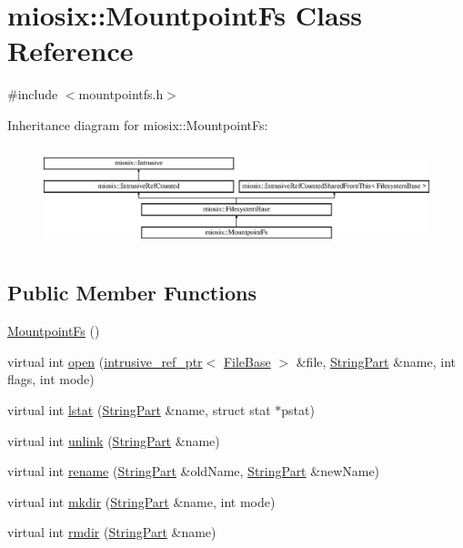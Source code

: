 \hypertarget{classmiosix_1_1_mountpoint_fs}{\section{miosix\-:\-:Mountpoint\-Fs Class Reference}
\label{classmiosix_1_1_mountpoint_fs}
}


{\ttfamily \#include $<$mountpointfs.\-h$>$}

Inheritance diagram for miosix\-:\-:Mountpoint\-Fs\-:\begin{figure}[H]
\begin{center}
\leavevmode
\includegraphics[height=2.962963cm]{classmiosix_1_1_mountpoint_fs}
\end{center}
\end{figure}
\subsection*{Public Member Functions}
\begin{DoxyCompactItemize}
\item 
\hyperlink{classmiosix_1_1_mountpoint_fs_ad4a9516d403dce0cffacfcde4f7e95c3}{Mountpoint\-Fs} ()
\item 
virtual int \hyperlink{classmiosix_1_1_mountpoint_fs_ad27fe12dd7a0ebf4710e3c1239fa4f11}{open} (\hyperlink{classmiosix_1_1intrusive__ref__ptr}{intrusive\-\_\-ref\-\_\-ptr}$<$ \hyperlink{classmiosix_1_1_file_base}{File\-Base} $>$ \&file, \hyperlink{classmiosix_1_1_string_part}{String\-Part} \&name, int flags, int mode)
\item 
virtual int \hyperlink{classmiosix_1_1_mountpoint_fs_ae5edc737cac9355b1df1e70f05ed28c7}{lstat} (\hyperlink{classmiosix_1_1_string_part}{String\-Part} \&name, struct stat $\ast$pstat)
\item 
virtual int \hyperlink{classmiosix_1_1_mountpoint_fs_a91111599924d60eee312661a8fca544b}{unlink} (\hyperlink{classmiosix_1_1_string_part}{String\-Part} \&name)
\item 
virtual int \hyperlink{classmiosix_1_1_mountpoint_fs_ab24e62499734c86f42c9a6ccfd28ae7e}{rename} (\hyperlink{classmiosix_1_1_string_part}{String\-Part} \&old\-Name, \hyperlink{classmiosix_1_1_string_part}{String\-Part} \&new\-Name)
\item 
virtual int \hyperlink{classmiosix_1_1_mountpoint_fs_aa5660ee6a136c9e3a9e3512a800c1069}{mkdir} (\hyperlink{classmiosix_1_1_string_part}{String\-Part} \&name, int mode)
\item 
virtual int \hyperlink{classmiosix_1_1_mountpoint_fs_a41c03e60fca3733f7f2d9902063efc2e}{rmdir} (\hyperlink{classmiosix_1_1_string_part}{String\-Part} \&name)
\end{DoxyCompactItemize}
